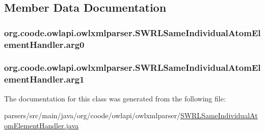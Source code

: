 \subsection{Member Data Documentation}
\hypertarget{classorg_1_1coode_1_1owlapi_1_1owlxmlparser_1_1_s_w_r_l_same_individual_atom_element_handler_af36ba5951ee37e34a5ed69bfc290db2b}{
\subsubsection[{arg0}]{ org.\-coode.\-owlapi.\-owlxmlparser.\-S\-W\-R\-L\-Same\-Individual\-Atom\-Element\-Handler.\-arg0\hspace{0.3cm}{\ttfamily [private]}}}\label{classorg_1_1coode_1_1owlapi_1_1owlxmlparser_1_1_s_w_r_l_same_individual_atom_element_handler_af36ba5951ee37e34a5ed69bfc290db2b}
\hypertarget{classorg_1_1coode_1_1owlapi_1_1owlxmlparser_1_1_s_w_r_l_same_individual_atom_element_handler_af6b13b574355386382dd587d75cbd7a7}{
\subsubsection[{arg1}]{ org.\-coode.\-owlapi.\-owlxmlparser.\-S\-W\-R\-L\-Same\-Individual\-Atom\-Element\-Handler.\-arg1\hspace{0.3cm}{\ttfamily [private]}}}\label{classorg_1_1coode_1_1owlapi_1_1owlxmlparser_1_1_s_w_r_l_same_individual_atom_element_handler_af6b13b574355386382dd587d75cbd7a7}


The documentation for this class was generated from the following file\-:\begin{DoxyCompactItemize}
\item 
parsers/src/main/java/org/coode/owlapi/owlxmlparser/\hyperlink{_s_w_r_l_same_individual_atom_element_handler_8java}{S\-W\-R\-L\-Same\-Individual\-Atom\-Element\-Handler.\-java}\end{DoxyCompactItemize}
